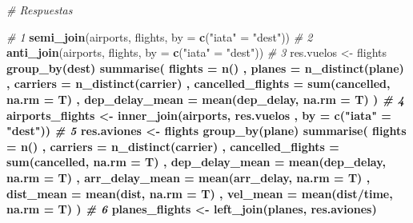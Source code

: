 \documentclass[]{article}
\newenvironment{Shaded}{\begin{snugshade}}{\end{snugshade}}
\newcommand{\KeywordTok}[1]{\textcolor[rgb]{0.13,0.29,0.53}{\textbf{#1}}}
\newcommand{\DataTypeTok}[1]{\textcolor[rgb]{0.13,0.29,0.53}{#1}}
\newcommand{\StringTok}[1]{\textcolor[rgb]{0.31,0.60,0.02}{#1}}
\newcommand{\CommentTok}[1]{\textcolor[rgb]{0.56,0.35,0.01}{\textit{#1}}}
\newcommand{\OperatorTok}[1]{\textcolor[rgb]{0.81,0.36,0.00}{\textbf{#1}}}
\newcommand{\NormalTok}[1]{#1}
\begin{document}
\begin{Shaded}
\begin{Highlighting}[]
\CommentTok{# Respuestas}

\CommentTok{# 1}
\KeywordTok{semi_join}\NormalTok{(airports, flights, }\DataTypeTok{by =} \KeywordTok{c}\NormalTok{(}\StringTok{"iata"}\NormalTok{ =}\StringTok{ "dest"}\NormalTok{))}
\CommentTok{# 2}
\KeywordTok{anti_join}\NormalTok{(airports, flights, }\DataTypeTok{by =} \KeywordTok{c}\NormalTok{(}\StringTok{"iata"}\NormalTok{ =}\StringTok{ "dest"}\NormalTok{))}
\CommentTok{# 3}
\NormalTok{res.vuelos <-}\StringTok{ }\NormalTok{flights }\OperatorTok{%
\StringTok{  }\KeywordTok{group_by}\NormalTok{(dest) }\OperatorTok{%
\StringTok{  }\KeywordTok{summarise}\NormalTok{(}
    \DataTypeTok{flights =} \KeywordTok{n}\NormalTok{()}
\NormalTok{    , }\DataTypeTok{planes =} \KeywordTok{n_distinct}\NormalTok{(plane)}
\NormalTok{    , }\DataTypeTok{carriers =} \KeywordTok{n_distinct}\NormalTok{(carrier)}
\NormalTok{    , }\DataTypeTok{cancelled_flights =} \KeywordTok{sum}\NormalTok{(cancelled, }\DataTypeTok{na.rm =}\NormalTok{ T)}
\NormalTok{    , }\DataTypeTok{dep_delay_mean =} \KeywordTok{mean}\NormalTok{(dep_delay, }\DataTypeTok{na.rm =}\NormalTok{ T)}
\NormalTok{  )}
\CommentTok{# 4}
\NormalTok{airports_flights <-}\StringTok{ }\KeywordTok{inner_join}\NormalTok{(airports, res.vuelos}
\NormalTok{                               , }\DataTypeTok{by =} \KeywordTok{c}\NormalTok{(}\StringTok{"iata"}\NormalTok{ =}\StringTok{ "dest"}\NormalTok{))}
\CommentTok{# 5}
\NormalTok{res.aviones <-}\StringTok{ }\NormalTok{flights }\OperatorTok{%
\StringTok{  }\KeywordTok{group_by}\NormalTok{(plane) }\OperatorTok{%
\StringTok{  }\KeywordTok{summarise}\NormalTok{(}
    \DataTypeTok{flights =} \KeywordTok{n}\NormalTok{()}
\NormalTok{    , }\DataTypeTok{carriers =} \KeywordTok{n_distinct}\NormalTok{(carrier)}
\NormalTok{    , }\DataTypeTok{cancelled_flights =} \KeywordTok{sum}\NormalTok{(cancelled, }\DataTypeTok{na.rm =}\NormalTok{ T)}
\NormalTok{    , }\DataTypeTok{dep_delay_mean =} \KeywordTok{mean}\NormalTok{(dep_delay, }\DataTypeTok{na.rm =}\NormalTok{ T)}
\NormalTok{    , }\DataTypeTok{arr_delay_mean =} \KeywordTok{mean}\NormalTok{(arr_delay, }\DataTypeTok{na.rm =}\NormalTok{ T)}
\NormalTok{    , }\DataTypeTok{dist_mean =} \KeywordTok{mean}\NormalTok{(dist, }\DataTypeTok{na.rm =}\NormalTok{ T)}
\NormalTok{    , }\DataTypeTok{vel_mean =} \KeywordTok{mean}\NormalTok{(dist}\OperatorTok{/}\NormalTok{time, }\DataTypeTok{na.rm =}\NormalTok{ T)}
\NormalTok{  ) }
\CommentTok{# 6}
\NormalTok{planes_flights <-}\StringTok{ }\KeywordTok{left_join}\NormalTok{(planes, res.aviones)}
}}}}
\end{Highlighting}
\end{Shaded}
\end{document}
